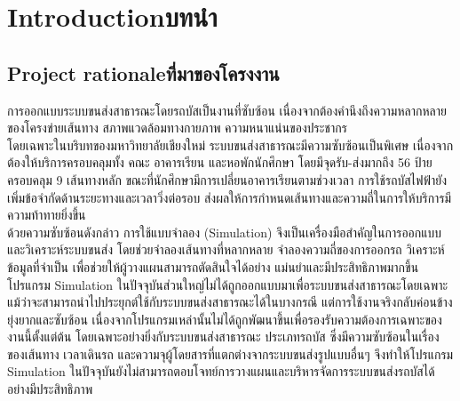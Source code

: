\chapter{\ifenglish Introduction\else บทนำ\fi}

\newenvironment{mypara}{\par\indent}{}

\setlength{\parindent}{2em}

\section{\ifenglish Project rationale\else ที่มาของโครงงาน\fi}
\begin{mypara}
    \indent การออกแบบระบบขนส่งสาธารณะโดยรถบัสเป็นงานที่ซับซ้อน เนื่องจากต้องคำนึงถึงความหลากหลายของโครงข่ายเส้นทาง 
    สภาพแวดล้อมทางกายภาพ ความหนาแน่นของประชากร \\ 
    \indent โดยเฉพาะในบริบทของมหาวิทยาลัยเชียงใหม่ ระบบขนส่งสาธารณะมีความซับซ้อนเป็นพิเศษ 
    เนื่องจากต้องให้บริการครอบคลุมทั้ง คณะ อาคารเรียน และหอพักนักศึกษา โดยมีจุดรับ-ส่งมากถึง 56 ป้าย ครอบคลุม 9 เส้นทางหลัก 
    ขณะที่นักศึกษามีการเปลี่ยนอาคารเรียนตามช่วงเวลา การใช้รถบัสไฟฟ้ายังเพิ่มข้อจำกัดด้านระยะทางและเวลาวิ่งต่อรอบ 
    ส่งผลให้การกำหนดเส้นทางและความถี่ในการให้บริการมีความท้าทายยิ่งขึ้น \\
    \indent ด้วยความซับซ้อนดังกล่าว การใช้แบบจำลอง (Simulation) จึงเป็นเครื่องมือสำคัญในการออกแบบและวิเคราะห์ระบบขนส่ง 
    โดยช่วยจำลองเส้นทางที่หลากหลาย จำลองความถี่ของการออกรถ วิเคราะห์ข้อมูลที่จำเป็น เพื่อช่วยให้ผู้วางแผนสามารถตัดสินใจได้อย่าง
    แม่นยำและมีประสิทธิภาพมากขึ้น  \\
    \indent โปรแกรม Simulation ในปัจจุบันส่วนใหญ่ไม่ได้ถูกออกแบบมาเพื่อระบบขนส่งสาธารณะโดยเฉพาะ \\
    แม้ว่าจะสามารถนำไปประยุกต์ใช้กับระบบขนส่งสาธารณะได้ในบางกรณี แต่การใช้งานจริงกลับค่อนข้างยุ่งยากและซับซ้อน 
    เนื่องจากโปรแกรมเหล่านั้นไม่ได้ถูกพัฒนาขึ้นเพื่อรองรับความต้องการเฉพาะของงานนี้ตั้งแต่ต้น โดยเฉพาะอย่างยิ่งกับระบบขนส่งสาธารณะ
    ประเภทรถบัส ซึ่งมีความซับซ้อนในเรื่องของเส้นทาง เวลาเดินรถ และความจุผู้โดยสารที่แตกต่างจากระบบขนส่งรูปแบบอื่นๆ 
    จึงทำให้โปรแกรม Simulation ในปัจจุบันยังไม่สามารถตอบโจทย์การวางแผนและบริหารจัดการระบบขนส่งรถบัสได้อย่างมีประสิทธิภาพ

\end{mypara}

